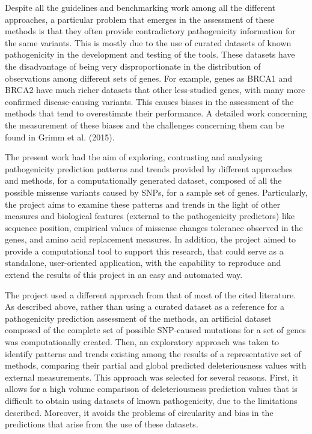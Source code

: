 \documentclass[12pt,MSc,wordcount,anon]{muthesis}
\begin{document}
\begin{flushleft}
Despite all the guidelines and benchmarking work among all the different approaches, a particular problem that emerges in the assessment of these methods is that they often provide contradictory pathogenicity information for the same variants. This is mostly due to the use of curated datasets of known pathogenicity in the development and testing of the tools. These datasets have the disadvantage of being very disproportionate in the distribution of observations among different sets of genes. For example, genes as BRCA1 and BRCA2 have much richer datasets that other less-studied genes, with many more confirmed disease-causing variants. This causes biases in the assessment of the methods that tend to overestimate their performance. A detailed work concerning the measurement of these biases and the challenges concerning them can be found in Grimm et al. (2015).

The present work had the aim of exploring, contrasting and analysing pathogenicity prediction patterns and trends provided by different approaches and methods, for a computationally generated dataset, composed of all the possible missense variants caused by SNPs, for a sample set of genes. Particularly, the project aims to examine these patterns and trends in the light of other measures and biological features (external to the pathogenicity predictors) like sequence position, empirical values of missense changes tolerance observed in the genes, and amino acid replacement measures. In addition, the project aimed to provide a computational tool to support this research, that could serve as a standalone, user-oriented application, with the capability to reproduce and extend the results of this project in an easy and automated way.

The project used a different approach from that of most of the cited literature. As described above, rather than using a curated dataset as a reference for a pathogenicity prediction assessment of the methods, an artificial dataset composed of the complete set of possible SNP-caused mutations for a set of genes was computationally created. Then, an exploratory approach was taken to identify patterns and trends existing among the results of a representative set of methods, comparing their partial and global predicted deleteriousness values with external measurements. This approach was selected for several reasons. First, it allows for a high volume comparison of deleteriousness prediction values that is difficult to obtain using datasets of known pathogenicity, due to the limitations described. Moreover, it avoids the problems of circularity and bias in the predictions that arise from the use of these datasets.


\end{flushleft}
\end{document}
